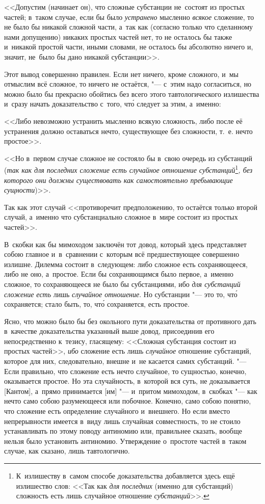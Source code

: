 <<Допустим (начинает он), что сложные субстанции не~состоят из простых частей;
в~таком случае, если бы было {\em устранено} мысленно {\em всякое} сложение, то
не было бы никакой сложной части, а~так как (согласно только что сделанному
нами допущению) никаких простых частей нет, то не осталось бы также и~никакой
простой части, иными словами, не осталось бы абсолютно ничего и, значит,
не~было бы дано никакой субстанции>>.

Этот вывод совершенно правилен. Если нет ничего, кроме сложного, и~мы
отмыслим всё сложное, то ничего не остаётся, "--- с~этим надо согласиться, но
можно было бы прекрасно обойтись без всего этого тавтологического излишества
и~сразу начать доказательство с~того, чт\'{о} следует за этим, а~именно:

<<Либо невозможно устранить мысленно всякую сложность, либо после её устранения
должно оставаться нечто, существующее без сложности, т.~е. нечто простое>>.

<<Но в~первом случае сложное не состояло бы в~свою очередь из субстанций
({\em так как для последних сложение есть случайное
отношение субстанций}\footnote{К~излишеству в~самом способе
доказательства добавляется здесь ещё излишество слов: <<Так как
{\em для последних} (именно для субстанций) сложность есть лишь случайное
отношение {\em субстанций}>>.}{\em , без которого они должны
существовать как самостоятельно пребывающие сущности})>>.

Так как этот случай <<противоречит предположению, то остаётся
только второй случай, а~именно что субстанциально
сложное в~мире состоит из простых частей>>.

В~скобки как бы мимоходом заключён тот довод, который здесь представляет
собою главное и~в~сравнении с~которым всё предшествующее совершенно излишне.
Дилемма состоит в~следующем: либо сложное есть сохраняющееся, либо не оно,
а~простое. Если бы сохраняющимся было первое, а~именно сложное,
то сохраняющееся не было бы субстанциями, ибо {\em для субстанций
сложение есть} лишь {\em случайное отношение}. Но субстанции "--- это то,
чт\'{о} сохраняется; стало быть, то, чт\'{о} сохраняется, есть простое.

Ясно, что можно было бы без окольного пути доказательства от противного дать
в~качестве доказательства указанный выше довод, присоединив его
непосредственно к~тезису, гласящему: <<Сложная субстанция состоит из простых
частей>>, {\em ибо} сложение есть лишь {\em случайное} отношение субстанций,
которое для них, следовательно, внешне и~не касается самих субстанций. "---
Если правильно, что сложение есть нечто случайное, то сущностью, конечно,
оказывается простое. Но эта случайность, в~которой вся суть, не доказывается
[Кантом], а~прямо принимается [им] "--- и~притом мимоходом, в~скобках "--- как
нечто само собою разумеющееся или побочное. Конечно, само собою понятно, что
сложение есть определение случайного и~внешнего. Но если вместо непрерывности
имеется в~виду лишь случайная совместность, то не стоило устанавливать
по этому поводу антиномию или, правильнее сказать, вообще нельзя было
установить антиномию. Утверждение о~простоте частей в~таком случае,
как сказано, лишь тавтологично.

